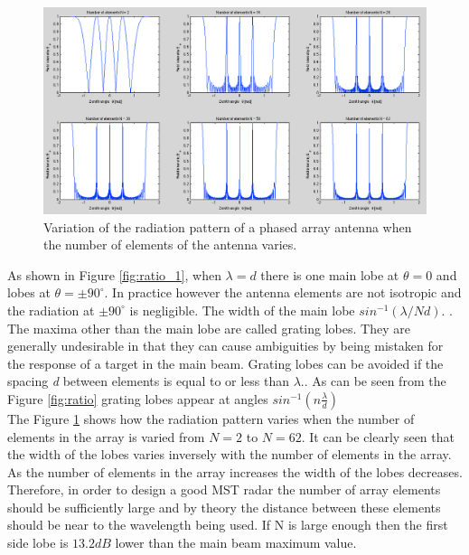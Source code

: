\documentclass{article}
\begin{document}
\begin{figure}[h!]
\centering
\includegraphics[width=\textwidth]{Figures/elements.png}
\caption{Variation of the radiation pattern of a phased array antenna when the number of elements of the antenna varies.}
\label{fig:elements}
\end{figure}

As shown in Figure \ref{fig:ratio_1}, when $\lambda = d$ there is one main lobe at $\theta = 0$ and lobes at $\theta =  \pm 90^{\circ}$.  In practice however the antenna elements are not isotropic and the radiation at $\pm 90^{\circ}$ is negligible. The width of the main lobe $sin^{-1}(\lambda/Nd)$. \cite{Rottger:2000ip}. The maxima other than the main lobe are called grating lobes. They are generally undesirable in that they can cause ambiguities by being mistaken for the response of a target in the main beam. Grating lobes can be avoided if the spacing \textit{d} between elements is equal to or less than $\lambda$.\cite{Skolnik:2001irs}. As can be seen from the Figure \ref{fig:ratio} grating lobes appear at angles $sin^{-1}(n\frac{\lambda}{d})$ \cite{Rottger:2000ip}\\

The Figure \ref{fig:elements} shows how the radiation pattern varies when the number of elements in the array is varied from $N = 2$ to $N = 62$. It can be clearly seen that the width of the lobes varies inversely with the number of elements in the array. As the number of elements in the array increases the width of the lobes decreases.\\

Therefore, in order to design a good MST radar the number of array elements should be sufficiently large and by theory the distance between these elements should be near to the wavelength being used. If N is large enough then the first side lobe is $13.2 dB$ lower than the main beam maximum value.\cite{Skolnik:2001irs}\\
\end{document}
